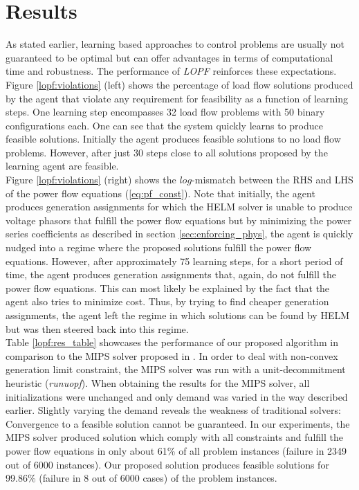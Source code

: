 \section{Results}
\label{sec:LOPFresults}
As stated earlier, learning based approaches to control problems are usually not guaranteed to be optimal but can offer advantages in terms of computational time and robustness. The performance of \emph{LOPF} reinforces these expectations. Figure \ref{lopf:violations} (left) shows the percentage of load flow solutions produced by the agent that violate any requirement for feasibility as a function of learning steps. One learning step encompasses 32 load flow problems with 50 binary configurations each. One can see that the system quickly learns to produce feasible solutions. Initially the agent produces feasible solutions to no load flow problems. However, after just 30 steps close to all solutions proposed by the learning agent are feasible.\\
Figure \ref{lopf:violations} (right) shows the $log$-mismatch between the RHS and LHS of the power flow equations (\ref{eq:pf_const}). Note that initially, the agent produces generation assignments for which the HELM solver is unable to produce voltage phasors that fulfill the power flow equations but by minimizing the power series coefficients as described in section \ref{sec:enforcing_phys}, the agent is quickly nudged into a regime where the proposed solutions fulfill the power flow equations. However, after approximately 75 learning steps, for a short period of time, the agent produces generation assignments that, again, do not fulfill the power flow equations. This can most likely be explained by the fact that the agent also tries to minimize cost. Thus, by trying to find cheaper generation assignments, the agent left the regime in which solutions can be found by HELM but was then steered back into this regime.\\
Table \ref{lopf:res_table} showcases the performance of our proposed algorithm in comparison to the MIPS solver proposed in \cite{zimmerman2011matpower}. In order to deal with non-convex generation limit constraint, the MIPS solver was run with a unit-decommitment heuristic (\emph{runuopf}). When obtaining the results for the MIPS solver, all initializations were unchanged and only demand was varied in the way described earlier. Slightly varying the demand reveals the weakness of traditional solvers: Convergence to a feasible solution cannot be guaranteed. In our experiments, the MIPS solver produced solution which comply with all constraints and fulfill the power flow equations in only about 61\% of all problem instances (failure in 2349 out of 6000 instances). Our proposed solution produces feasible solutions for 99.86\% (failure in 8 out of 6000 cases) of the problem instances.\\
